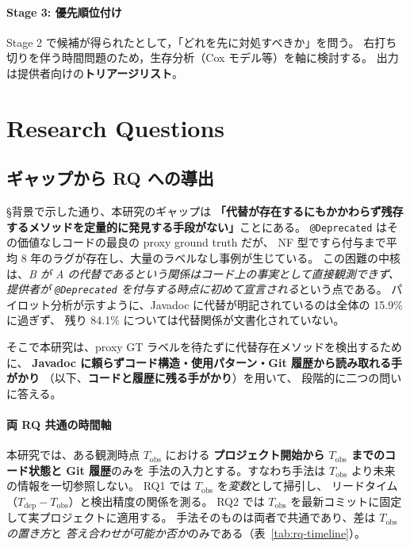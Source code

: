 \documentclass[a4paper,12pt]{article}
\begin{document}
\paragraph{Stage 3: 優先順位付け}
Stage 2 で候補が得られたとして，「どれを先に対処すべきか」を問う。
右打ち切りを伴う時間問題のため，生存分析（Cox モデル等）を軸に検討する。
出力は提供者向けの\textbf{トリアージリスト}。

\section{Research Questions}

\subsection*{ギャップから RQ への導出}

§背景で示した通り、本研究のギャップは
\textbf{「代替が存在するにもかかわらず残存するメソッドを定量的に発見する手段がない」}ことにある。
\texttt{@Deprecated} はその価値なしコードの最良の proxy ground truth だが、
NF 型ですら付与まで平均 8 年のラグが存在し、大量のラベルなし事例が生じている。
この困難の中核は、\emph{B が A の代替であるという関係はコード上の事実として直接観測できず、
提供者が \texttt{@Deprecated} を付与する時点に初めて宣言される}という点である。
パイロット分析が示すように、Javadoc に代替が明記されているのは全体の 15.9\% に過ぎず、
残り 84.1\% については代替関係が文書化されていない。

そこで本研究は、proxy GT ラベルを待たずに代替存在メソッドを検出するために、
\textbf{Javadoc に頼らずコード構造・使用パターン・Git 履歴から読み取れる手がかり}
（以下、\textbf{コードと履歴に残る手がかり}）を用いて、
段階的に二つの問いに答える。

\paragraph{両 RQ 共通の時間軸}
本研究では、ある観測時点 $T_{\text{obs}}$ における
\textbf{プロジェクト開始から $T_{\text{obs}}$ までのコード状態と Git 履歴}のみを
手法の入力とする。すなわち手法は $T_{\text{obs}}$ より未来の情報を一切参照しない。
RQ1 では $T_{\text{obs}}$ を\emph{変数}として掃引し、
リードタイム（$T_{\text{dep}} - T_{\text{obs}}$）と検出精度の関係を測る。
RQ2 では $T_{\text{obs}}$ を最新コミットに固定して実プロジェクトに適用する。
手法そのものは両者で共通であり、差は \emph{$T_{\text{obs}}$ の置き方}と
\emph{答え合わせが可能か否か}のみである（表~\ref{tab:rq-timeline}）。
\end{document}
